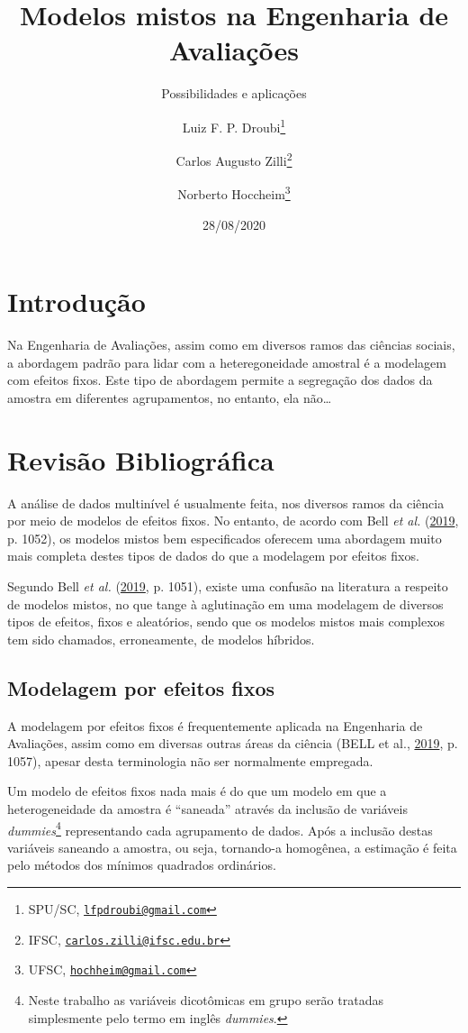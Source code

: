 \documentclass[
  a4paper, 11pt]{article}
\title{Modelos mistos na Engenharia de Avaliações}
\subtitle{Possibilidades e aplicações}
\author{Luiz F. P. Droubi\footnote{SPU/SC,
  \href{mailto:lfpdroubi@gmail.com}{\nolinkurl{lfpdroubi@gmail.com}}} \and Carlos Augusto Zilli\footnote{IFSC,
  \href{mailto:carlos.zilli@ifsc.edu.br}{\nolinkurl{carlos.zilli@ifsc.edu.br}}} \and Norberto Hoccheim\footnote{UFSC,
  \href{mailto:hochheim@gmail.com}{\nolinkurl{hochheim@gmail.com}}}}
\date{28/08/2020}
\begin{document}
\maketitle

\hypertarget{introduuxe7uxe3o}{%
\section{Introdução}\label{introduuxe7uxe3o}}

Na Engenharia de Avaliações, assim como em diversos ramos das ciências
sociais, a abordagem padrão para lidar com a heteregoneidade amostral é
a modelagem com efeitos fixos. Este tipo de abordagem permite a
segregação dos dados da amostra em diferentes agrupamentos, no entanto,
ela não\ldots{}

\hypertarget{revisuxe3o-bibliogruxe1fica}{%
\section{Revisão Bibliográfica}\label{revisuxe3o-bibliogruxe1fica}}

A análise de dados multinível é usualmente feita, nos diversos ramos da
ciência por meio de modelos de efeitos fixos. No entanto, de acordo com
Bell \emph{et al.} (\protect\hyperlink{ref-bell2019}{2019}, p. 1052), os
modelos mistos bem especificados oferecem uma abordagem muito mais
completa destes tipos de dados do que a modelagem por efeitos fixos.

Segundo Bell \emph{et al.} (\protect\hyperlink{ref-bell2019}{2019}, p.
1051), existe uma confusão na literatura a respeito de modelos mistos,
no que tange à aglutinação em uma modelagem de diversos tipos de
efeitos, fixos e aleatórios, sendo que os modelos mistos mais complexos
tem sido chamados, erroneamente, de modelos híbridos.

\hypertarget{modelagem-por-efeitos-fixos}{%
\subsection{Modelagem por efeitos
fixos}\label{modelagem-por-efeitos-fixos}}

A modelagem por efeitos fixos é frequentemente aplicada na Engenharia de
Avaliações, assim como em diversas outras áreas da ciência (BELL et al.,
\protect\hyperlink{ref-bell2019}{2019}, p. 1057), apesar desta
terminologia não ser normalmente empregada.

Um modelo de efeitos fixos nada mais é do que um modelo em que a
heterogeneidade da amostra é ``saneada'' através da inclusão de
variáveis \emph{dummies}\footnote{Neste trabalho as variáveis
  dicotômicas em grupo serão tratadas simplesmente pelo termo em inglês
  \emph{dummies}.} representando cada agrupamento de dados. Após a
inclusão destas variáveis saneando a amostra, ou seja, tornando-a
homogênea, a estimação é feita pelo métodos dos mínimos quadrados
ordinários.
\end{document}
